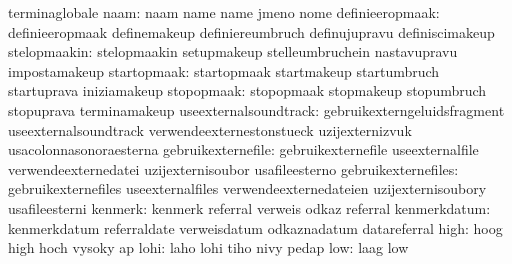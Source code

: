                                   terminaglobale
                            naam: naam                             name
                                  name                             jmeno
                                  nome
                 definieeropmaak: definieeropmaak                  definemakeup
                                  definiereumbruch                 definujupravu
                                  definiscimakeup                  %
                    stelopmaakin: stelopmaakin                     setupmakeup
                                  stelleumbruchein                 nastavupravu
                                  impostamakeup
                     startopmaak: startopmaak                      startmakeup
                                  startumbruch                     startuprava
                                  iniziamakeup
                      stopopmaak: stopopmaak                       stopmakeup
                                  stopumbruch                      stopuprava
                                  terminamakeup
           useexternalsoundtrack: gebruikexterngeluidsfragment     useexternalsoundtrack
                                  verwendeexternestonstueck        uzijexternizvuk
                                  usacolonnasonoraesterna
              gebruikexternefile: gebruikexternefile               useexternalfile
                                  verwendeexternedatei             uzijexternisoubor
                                  usafileesterno
             gebruikexternefiles: gebruikexternefiles              useexternalfiles
                                  verwendeexternedateien           uzijexternisoubory
                                  usafileesterni
                         kenmerk: kenmerk                          referral
                                  verweis                          odkaz
                                  referral                         %
                    kenmerkdatum: kenmerkdatum                     referraldate
                                  verweisdatum                     odkaznadatum
                                  datareferral
                            high: hoog                             high
                                  hoch                             vysoky
                                  ap
                            lohi: laho                             lohi
                                  tiho                             nivy
                                  pedap
                             low: laag                             low
